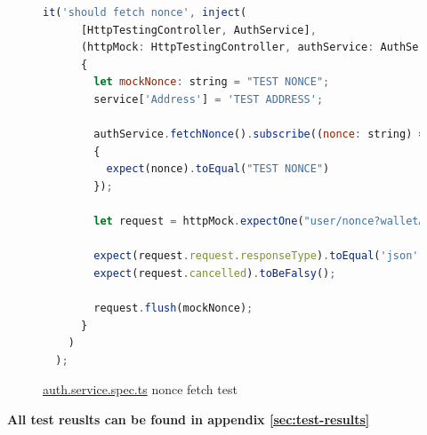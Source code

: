 \begin{figure}[H]
\caption{\href{https://github.com/MrHarrisonBarker/CRPL/blob/main/CRPL.Web/ClientApp/src/app/_Services/auth.service.spec.ts}{auth.service.spec.ts} nonce fetch test}
\centering
\begin{lstlisting}[language=JavaScript]
it('should fetch nonce', inject(
      [HttpTestingController, AuthService],
      (httpMock: HttpTestingController, authService: AuthService) =>
      {
        let mockNonce: string = "TEST NONCE";
        service['Address'] = 'TEST ADDRESS';

        authService.fetchNonce().subscribe((nonce: string) =>
        {
          expect(nonce).toEqual("TEST NONCE")
        });

        let request = httpMock.expectOne("user/nonce?walletAddress=TEST%20ADDRESS");

        expect(request.request.responseType).toEqual('json');
        expect(request.cancelled).toBeFalsy();

        request.flush(mockNonce);
      }
    )
  );
\end{lstlisting}
\end{figure}

\textbf{All test reuslts can be found in appendix \ref{sec:test-results}}


